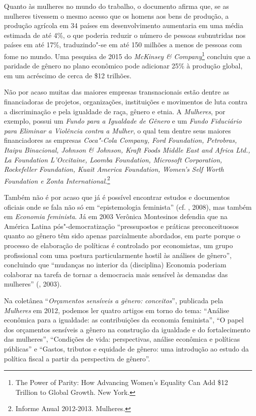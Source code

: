 Quanto às mulheres no mundo do trabalho, o documento afirma que, se as
mulheres tivessem o mesmo acesso que os homens aos bens de produção, a
produção agrícola em 34 países em desenvolvimento aumentaria em uma
média estimada de até 4\%, o que poderia reduzir o número de pessoas
subnutridas nos países em até 17\%, traduzindo"-se em até 150 milhões a
menos de pessoas com fome no mundo. Uma pesquisa de 2015 do
\emph{McKinsey \& Company}\footnote{The Power of Parity: How Advancing
  Women's Equality Can Add \$12 Trillion to Global Growth. New York.}
concluiu que a paridade de gênero no plano econômico pode adicionar 25\%
à produção global, em um acréscimo de cerca de \$12 trilhões.

Não por acaso muitas das maiores empresas transnacionais estão dentre as
financiadoras de projetos, organizações, instituições e movimentos de
luta contra a discriminação e pela igualdade de raça, gênero e etnia. A
\emph{ Mulheres}, por exemplo, possui um \emph{Fundo para a Igualdade
de Gênero} e um \emph{Fundo Fiduciário para Eliminar a Violência contra
a Mulher}, o qual tem dentre seus maiores financiadores as empresas
\emph{Coca"-Cola Company, Ford Foundation, Petrobras, Itaipu Binacional,
Johnson \& Johnson, Kraft Foods Middle East and Africa Ltd., La
Foundation L'Occitaine, Loomba Foundation, Microsoft Corporation,
Rockefeller Foundation, Kuait America Foundation, Women's Self Worth
Foundation e Zonta International}.\footnote{Informe Anual 2012-2013. 
  Mulheres.}

Também não é por acaso que já é possível encontrar estudos e documentos
oficiais onde se fala não só em ``epistemologia feminista'' (cf. ,
2008), mas também em \emph{Economia feminista}. Já em 2003 Verônica
Montesinos defendia que na América Latina pós"-democratização
``pressupostos e práticas preconceituosos quanto ao gênero têm sido
apenas parcialmente abordados, em parte porque o processo de elaboração
de políticas é controlado por economistas, um grupo profissional com uma
postura particularmente hostil às análises de gênero'', concluindo que
``mudanças no interior da (disciplina) Economia poderiam colaborar na
tarefa de tornar a democracia mais sensível às demandas das mulheres''
(, 2003).

Na coletânea ``\emph{Orçamentos sensíveis a gênero: conceitos}'',
publicada pela \emph{ Mulheres} em 2012, podemos ler quatro artigos
em torno do tema: ``Análise econômica para a igualdade: as contribuições
da economia feminista'', ``O papel dos orçamentos sensíveis a gênero na
construção da igualdade e do fortalecimento das mulheres'', ``Condições
de vida: perspectivas, análise econômica e políticas públicas'' e
``Gastos, tributos e equidade de gênero: uma introdução ao estudo da
política fiscal a partir da perspectiva de gênero''.

